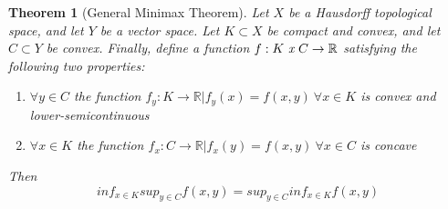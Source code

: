 \documentclass[12pt]{article}
\newtheorem{theorem}{Theorem}[section]
\theoremstyle{definition}
\theoremstyle{remark}
\begin{document}
\begin{theorem}[General Minimax Theorem]
Let $X$ be a Hausdorff topological space, and let $Y$ be a vector space. Let $K \subset X$ be compact and convex, and let $C \subset Y$ be convex. Finally, define a function $f: K\ \emph{x}\ C \rightarrow \mathbb{R}$ satisfying the following two properties:
\begin{enumerate}
	\item{$\forall y \in C$ the function $f_y: K \rightarrow \mathbb{R} | f_y(x) = f(x,y)\ \forall x \in K$ is convex and lower-semicontinuous}
	\item{$\forall x \in K$ the function $f_x: C \rightarrow \mathbb{R} | f_x(y) = f(x,y)\ \forall x \in C$ is concave}
\end{enumerate}
Then
\[inf_{x \in K} sup_{y \in C} f(x,y) = sup_{y \in C} inf_{x \in K} f(x,y)\]
\end{theorem}
\end{document}
